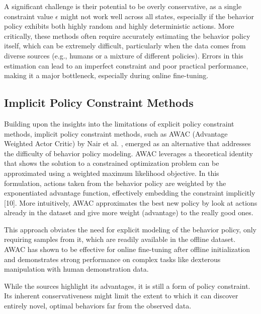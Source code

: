 A significant challenge is their potential to be overly conservative, as a single constraint value $\epsilon$  might not work well across all states, especially if the behavior policy exhibits both highly random and highly deterministic actions. More critically, these methods often require accurately estimating the behavior policy itself, which can be extremely difficult, particularly when the data comes from diverse sources (e.g., humans or a mixture of different policies). Errors in this estimation can lead to an imperfect constraint and poor practical performance, making it a major bottleneck, especially during online fine-tuning.


\subsection{Implicit Policy Constraint Methods}
Building upon the insights into the limitations of explicit policy constraint methods, implicit policy constraint methods, such as AWAC (Advantage Weighted Actor Critic) by Nair et al. \cite{nairAWACAcceleratingOnline2021}, emerged as an alternative that addresses the difficulty of behavior policy modeling. AWAC leverages a theoretical identity that shows the solution to a constrained optimization problem can be approximated using a weighted maximum likelihood objective. In this formulation, actions taken from the behavior policy are weighted by the exponentiated advantage function, effectively embedding the constraint implicitly [10]. More intuitively, AWAC approximates the best new policy by look at actions already in the dataset and give more weight (advantage) to the really good ones. 

This approach obviates the need for explicit modeling of the behavior policy, only requiring samples from it, which are readily available in the offline dataset. AWAC has shown to be effective for online fine-tuning after offline initialization and demonstrates strong performance on complex tasks like dexterous manipulation with human demonstration data.

While the sources highlight its advantages, it is still a form of policy constraint.  Its inherent conservativeness might limit the extent to which it can discover entirely novel, optimal behaviors far from the observed data.



